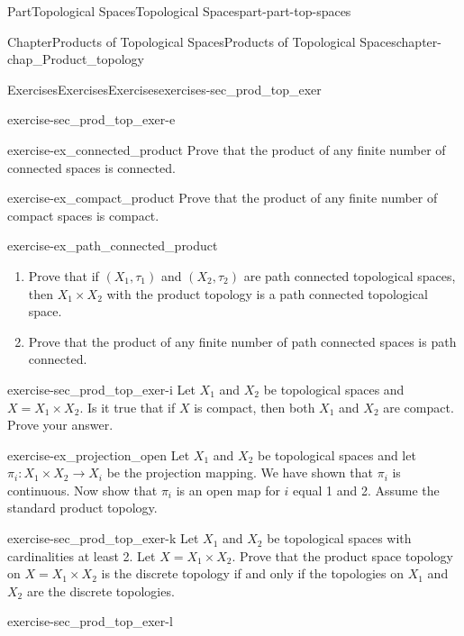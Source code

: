 \documentclass[oneside,10pt,]{book}
\numberwithin{equation}{chapter}
\begin{document}
\begin{partptx}{Part}{Topological Spaces}{}{Topological Spaces}{}{}{part-part-top-spaces}
\begin{chapterptx}{Chapter}{Products of Topological Spaces}{}{Products of Topological Spaces}{}{}{chapter-chap_Product_topology}
\begin{exercises-section}{Exercises}{Exercises}{}{Exercises}{}{}{exercises-sec_prod_top_exer}
\begin{divisionexercise}{5}{}{}{exercise-sec_prod_top_exer-e}
\begin{enumerate}[font=\bfseries,label=(\alph*),ref=\alph*]
\end{enumerate}%
\end{divisionexercise}%
\begin{divisionexercise}{6}{}{}{exercise-ex_connected_product}%
Prove that the product of any finite number of connected spaces is connected.%
\end{divisionexercise}%
\begin{divisionexercise}{7}{}{}{exercise-ex_compact_product}%
Prove that the product of any finite number of compact spaces is compact.%
\end{divisionexercise}%
\begin{divisionexercise}{8}{}{}{exercise-ex_path_connected_product}%
\begin{enumerate}[font=\bfseries,label=(\alph*),ref=\alph*]%
\item{}Prove that if \((X_1, \tau_1)\) and \((X_2, \tau_2)\) are path connected topological spaces, then \(X_1 \times X_2\) with the product topology is a path connected topological space.%
\item{}Prove that the product of any finite number of path connected spaces is path connected.%
\end{enumerate}%
\end{divisionexercise}%
\begin{divisionexercise}{9}{}{}{exercise-sec_prod_top_exer-i}%
Let \(X_1\) and \(X_2\) be topological spaces and \(X = X_1 \times X_2\). Is it true that if \(X\) is compact, then both \(X_1\) and \(X_2\) are compact. Prove your answer.%
\end{divisionexercise}%
\begin{divisionexercise}{10}{}{}{exercise-ex_projection_open}%
Let \(X_1\) and \(X_2\) be topological spaces and let \(\pi_i : X_1 \times X_2 \to X_i\) be the projection mapping. We have shown that \(\pi_i\) is continuous. Now show that \(\pi_i\) is an open map for \(i\) equal 1 and 2. Assume the standard product topology.%
\end{divisionexercise}%
\begin{divisionexercise}{11}{}{}{exercise-sec_prod_top_exer-k}%
Let \(X_1\) and \(X_2\) be topological spaces with cardinalities at least 2. Let \(X = X_1 \times X_2\). Prove that the product space topology on \(X = X_1 \times X_2\) is the discrete topology if and only if the topologies on \(X_1\) and \(X_2\) are the discrete topologies.%
\end{divisionexercise}%
\begin{divisionexercise}{12}{}{}{exercise-sec_prod_top_exer-l}%

\end{divisionexercise}
\end{exercises-section}
\end{chapterptx}
\end{partptx}
\end{document}
